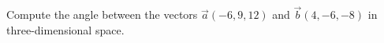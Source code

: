 Compute the angle between the vectors $\vec{a}(-6, 9, 12)$ and $\vec{b}(4, -6, -8)$ in three-dimensional space.
